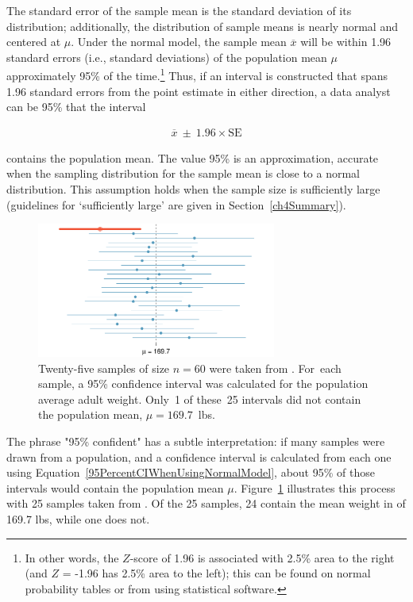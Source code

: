 The standard error of the sample mean is the standard deviation of its distribution; additionally, the distribution of sample means is nearly normal and centered at $\mu$. Under the normal model, the sample mean $\overline{x}$ will be within 1.96 standard errors (i.e., standard deviations) of the population mean $\mu$ approximately 95\% of the time.\footnote{In other words, the $Z$-score of 1.96 is associated with 2.5\% area to the right (and $Z$ = -1.96 has 2.5\% area to the left); this can be found on normal probability tables or from using statistical software.} Thus, if an interval is constructed that spans 1.96 standard errors from the point estimate in either direction, a data analyst can be 95\%  that the interval

\begin{align}
  \overline{x}\ \pm\ 1.96\times \text{SE} 
\label{95PercentCIWhenUsingNormalModel}
\end{align}

contains the population mean. The value 95\% is an approximation, accurate when the sampling distribution for the sample mean is close to a normal distribution. This assumption holds when the sample size is sufficiently large (guidelines for `sufficiently large' are given in Section~\ref{ch4Summary}).

\begin{figure}[h!]
	\centering
	\includegraphics[width=0.70\textwidth]
	{ch_inference_foundations_oi_biostat/figures/95PercentConfidenceInterval/95PercentConfidenceInterval.pdf}
	\caption{Twenty-five samples of size $n=60$ were taken from . For~each sample, a 95\% confidence interval was calculated for the population average adult weight. Only~1 of these~25 intervals did not contain the population mean, $\mu = 169.7$~lbs.}
	\label{95PercentConfidenceInterval}
\end{figure}

The phrase "95\% confident" has a subtle interpretation: if many samples were drawn from a population, and a confidence interval is calculated from each one using Equation~\ref{95PercentCIWhenUsingNormalModel}, about 95\% of those intervals would contain the population mean $\mu$. Figure~\ref{95PercentConfidenceInterval} illustrates this process with 25 samples taken from . Of the 25 samples, 24 contain the mean weight in  of 169.7 lbs, while one does not. 

